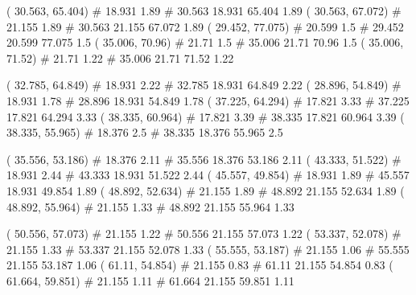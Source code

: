 \documentclass[a4paper,openbib,10pt]{article}
\newenvironment{treegraph}{\begin{graph}}{\end{graph}}
\begin{document}
\begin{treegraph}
  ( 30.563, 65.404) #     18.931    1.89
   #    30.563    18.931    65.404    1.89
  ( 30.563, 67.072) #     21.155    1.89
   #    30.563    21.155    67.072    1.89
  ( 29.452, 77.075) #     20.599    1.5
   #    29.452    20.599    77.075    1.5
  ( 35.006, 70.96) #     21.71    1.5
   #    35.006    21.71    70.96    1.5
  ( 35.006, 71.52) #     21.71    1.22
   #    35.006    21.71    71.52    1.22

  ( 32.785, 64.849) #     18.931    2.22
   #    32.785    18.931    64.849    2.22
  ( 28.896, 54.849) #     18.931    1.78
   #    28.896    18.931    54.849    1.78
  ( 37.225, 64.294) #     17.821    3.33
   #    37.225    17.821    64.294    3.33
  ( 38.335, 60.964) #     17.821    3.39
   #    38.335    17.821    60.964    3.39
  ( 38.335, 55.965) #     18.376    2.5
   #    38.335    18.376    55.965    2.5

  ( 35.556, 53.186) #     18.376    2.11
   #    35.556    18.376    53.186    2.11
  ( 43.333, 51.522) #     18.931    2.44
   #    43.333    18.931    51.522    2.44
  ( 45.557, 49.854) #     18.931    1.89
   #    45.557    18.931    49.854    1.89
  ( 48.892, 52.634) #     21.155    1.89
   #    48.892    21.155    52.634    1.89
  ( 48.892, 55.964) #     21.155    1.33
   #    48.892    21.155    55.964    1.33

  ( 50.556, 57.073) #     21.155    1.22
   #    50.556    21.155    57.073    1.22
  ( 53.337, 52.078) #     21.155    1.33
   #    53.337    21.155    52.078    1.33
  ( 55.555, 53.187) #     21.155    1.06
   #    55.555    21.155    53.187    1.06
  ( 61.11, 54.854) #     21.155    0.83
   #    61.11    21.155    54.854    0.83
  ( 61.664, 59.851) #     21.155    1.11
   #    61.664    21.155    59.851    1.11


\end{treegraph}
\end{document}
